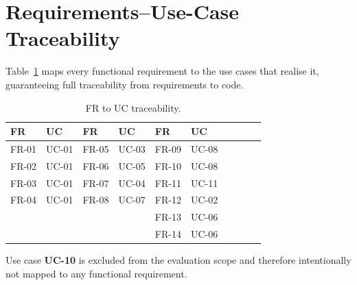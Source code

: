 \section{Requirements--Use-Case Traceability}

Table~\ref{tab:trace} maps every functional requirement to the use cases that
realise it, guaranteeing full traceability from requirements to code.

\begin{table}[H]
\centering
\caption{FR to UC traceability.}
\label{tab:trace}
\begin{tabular}{@{}ll@{}ll@{}ll@{}ll@{}ll@{}}
\toprule
\textbf{FR} & \textbf{UC} & \textbf{FR} & \textbf{UC} & \textbf{FR} & \textbf{UC} \\
\midrule
FR-01 & UC-01 & FR-05 & UC-03 & FR-09 & UC-08 \\
FR-02 & UC-01 & FR-06 & UC-05 & FR-10 & UC-08 \\
FR-03 & UC-01 & FR-07 & UC-04 & FR-11 & UC-11 \\
FR-04 & UC-01 & FR-08 & UC-07 & FR-12 & UC-02 \\
 & & & & FR-13 & UC-06 \\
 & & & & FR-14 & UC-06 \\
\bottomrule
\end{tabular}
\end{table}

Use case \textbf{UC-10} is excluded from the evaluation scope and therefore
intentionally not mapped to any functional requirement.
